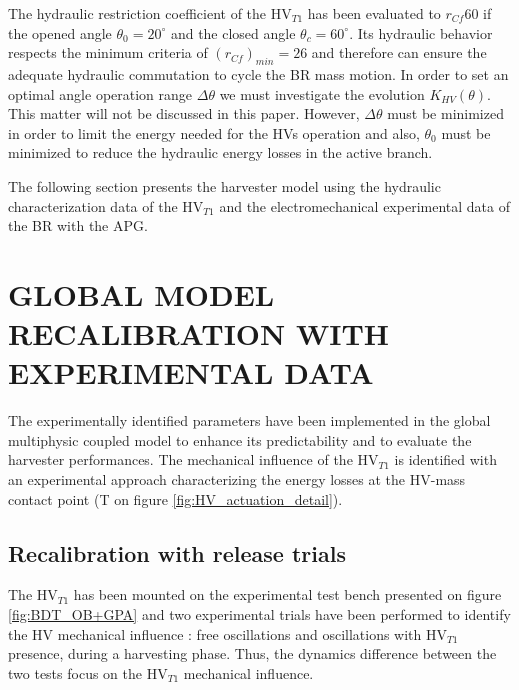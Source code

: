 \documentclass[3p,twocolumn,preprint]{elsarticle}
\begin{document}
The hydraulic restriction coefficient of the HV$_{T1}$ has been evaluated to $r_{Cf}60$ if the opened angle $\theta_0=20^{\circ}$ and the closed angle $\theta_c = 60^{\circ}$. Its hydraulic behavior respects the minimum criteria of \mbox{$(r_{Cf})_{min}=26$} and therefore can ensure the adequate hydraulic commutation to cycle the BR mass motion. In order to set an optimal angle operation range $\Delta\theta$ we must investigate the evolution $K_{HV}(\theta)$. This matter will not be discussed in this paper. However, $\Delta\theta$ must be minimized in order to limit the energy needed for the HVs operation and also, $\theta_0$ must be minimized to reduce the hydraulic energy losses in the active branch.

The following section presents the harvester model using the hydraulic characterization data of the HV$_{T1}$ and the electromechanical experimental data of the BR with the APG.

\section{GLOBAL MODEL RECALIBRATION WITH \mbox{EXPERIMENTAL} DATA}
\label{sec:MODEL RECALIBRATION WITH EXPERIMENTAL DATA}

The experimentally identified parameters have been implemented in the global multiphysic coupled model to enhance its predictability and to evaluate the harvester performances. The mechanical influence of the HV$_{T1}$ is identified with an experimental approach characterizing the energy losses at the HV-mass contact point (T on figure \ref{fig:HV_actuation_detail}). 

	\subsection{Recalibration with release trials}
The HV$_{T1}$ has been mounted on the experimental test bench presented on figure \ref{fig:BDT_OB+GPA} and two experimental trials have been performed to identify the HV mechanical influence : free oscillations and oscillations with HV$_{T1}$ presence, during a harvesting phase. Thus, the dynamics difference between the two tests focus on the HV$_{T1}$ mechanical influence. 
\end{document}
